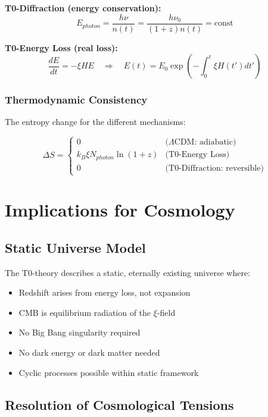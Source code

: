 \documentclass[12pt,a4paper]{article}
\theoremstyle{definition}
\begin{document}
	\textbf{T0-Diffraction (energy conservation):}
	\begin{equation}
		E_{photon} = \frac{h\nu}{n(t)} = \frac{h\nu_0}{(1+z)n(t)} = \text{const}
	\end{equation}
	
	\textbf{T0-Energy Loss (real loss):}
	\begin{equation}
		\frac{dE}{dt} = -\xi H E \quad \Rightarrow \quad E(t) = E_0 \exp\left(-\int_0^t \xi H(t') dt'\right)
	\end{equation}
	
	\subsubsection{Thermodynamic Consistency}
	
	The entropy change for the different mechanisms:
	
	\begin{equation}
		\Delta S = \begin{cases}
			0 & \text{($\Lambda$CDM: adiabatic)} \\
			k_B \xi N_{photon} \ln(1+z) & \text{(T0-Energy Loss)} \\
			0 & \text{(T0-Diffraction: reversible)}
		\end{cases}
	\end{equation}
	
	\section{Implications for Cosmology}
	
	\subsection{Static Universe Model}
	
	The T0-theory describes a static, eternally existing universe where:
	\begin{itemize}
		\item Redshift arises from energy loss, not expansion
		\item CMB is equilibrium radiation of the $\xi$-field
		\item No Big Bang singularity required
		\item No dark energy or dark matter needed
		\item Cyclic processes possible within static framework
	\end{itemize}
	
	\subsection{Resolution of Cosmological Tensions}
	
\end{document}
